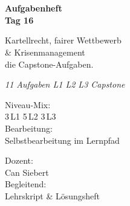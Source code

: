 \documentclass[11pt,a4paper,oneside]{article}
\newcommand{\caveatfontfallback}{\itshape}
\newcommand\caveatfont{\caveatfontfallback}%
\begin{document}
\begin{titlepage}
  \pagestyle{empty}
  \vspace*{1.5cm}
  \\[2pt]
  \noindent{\color{lpAccent}\rule{\linewidth}{1.2pt}}\\[4pt]

  \vspace{3cm}
  {\sffamily\fontsize{30}{34}\selectfont\bfseries\color{lpInk}Aufgabenheft\\Tag 16\par}

  \vspace{0.7cm}
  {\sffamily\large\color{lpGray}Kartellrecht, fairer Wettbewerb\\\& Krisenmanagement \textendash{}\\die Capstone-Aufgaben.\par}

  \vspace{1.5cm}
  {\caveatfont\LARGE\color{lpAmber}11 Aufgaben \textperiodcentered{} L1 \textperiodcentered{} L2 \textperiodcentered{} L3 \textperiodcentered{} Capstone}\par

  \vfill

  \noindent\begin{minipage}{0.55\linewidth}
    {\sffamily\footnotesize\color{lpGray}Niveau-Mix:}\\
    {\sffamily\small\color{lpInk}3\,\textsf{L1} \textperiodcentered{} 5\,\textsf{L2} \textperiodcentered{} 3\,\textsf{L3}}\\[10pt]
    {\sffamily\footnotesize\color{lpGray}Bearbeitung:}\\
    {\sffamily\small\color{lpInk}Selbstbearbeitung im Lernpfad}
  \end{minipage}\hfill
  \begin{minipage}{0.4\linewidth}
    \raggedleft
    {\sffamily\footnotesize\color{lpGray}Dozent:}\\
    {\sffamily\small\color{lpInk}Can Siebert}\\[10pt]
    {\sffamily\footnotesize\color{lpGray}Begleitend:}\\
    {\sffamily\small\color{lpInk}Lehrskript \& Lösungsheft}
  \end{minipage}

  \vspace{0.5cm}
  \noindent{\color{lpAccent}\rule{\linewidth}{0.6pt}}
\end{titlepage}
\end{document}
